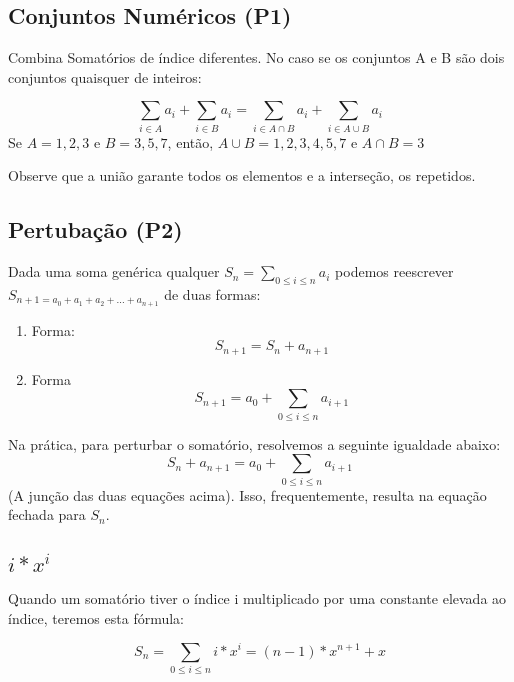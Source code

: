 \documentclass[12pt]{article}
\begin{document}
\subsection{Conjuntos Numéricos (P1)}
Combina Somatórios de índice diferentes. No caso se os conjuntos A e B são dois
conjuntos quaisquer de inteiros:

\begingroup 
\LARGE
\begin{equation}
\sum_{i\in A}a_i + \sum_{i\in B}a_i = \sum_{i\in A\cap B}a_i + \sum_{i\in A\cup B}a_i
\end{equation}
\endgroup
Se $A = {1,2,3}$ e $B = {3,5,7}$, então, $A\cup B = {1,2,3,4,5,7}$ e $A\cap B = {3}$
\par Observe que a união garante todos os elementos e a interseção, os repetidos.

\subsection{Pertubação (P2)}
Dada uma soma genérica qualquer $S_n = \sum_{0\leq i\leq n}a_i$
podemos reescrever $S_{n+1 = a_0 +a_1 +a_2 +\dots+ a_{n+1}}$
de duas formas:
\begin{enumerate}
    \item Forma:
        \begingroup 
        \LARGE
        \begin{equation}
            S_{n+1}=S_n + a_{n+1}
        \end{equation}
        \endgroup
    \item Forma
        \begingroup 
        \LARGE
        \begin{equation}
            S_{n+1} = a_0 + \sum_{0\leq i\leq n}a_{i+1}
        \end{equation}
        \endgroup
\end{enumerate}
\par Na prática, para perturbar o somatório, resolvemos a seguinte igualdade abaixo:
\begingroup 
\LARGE
\begin{equation}
    S_{n} + a_{n+1} = a_0 + \sum_{0\leq i\leq n}a_{i+1}
\end{equation}
\endgroup
(A junção das duas equações acima).
Isso, frequentemente, resulta na equação fechada para $S_n$.
\subsection{$i*x^i$}
Quando um somatório tiver o índice i multiplicado por uma constante
elevada ao índice, teremos esta fórmula:

\begingroup
\LARGE
\begin{equation}
    S_n = \sum_{0\leq i\leq n}i*x^i = (n-1)*x^{n+1} + x
\end{equation}
\endgroup
\end{document}
